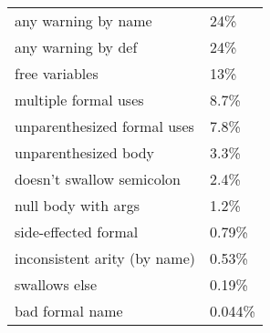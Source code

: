 \begin{tabular}{|l|l|} \hline
any warning by name & 24\% \\ 
any warning by def & 24\% \\ 
free variables & 13\% \\ 
multiple formal uses & 8.7\% \\ 
unparenthesized formal uses & 7.8\% \\ 
unparenthesized body & 3.3\% \\ 
doesn't swallow semicolon & 2.4\% \\ 
null body with args & 1.2\% \\ 
side-effected formal & 0.79\% \\ 
inconsistent arity (by name) & 0.53\% \\ 
swallows else & 0.19\% \\
bad formal name & 0.044\% \\ 
\hline
\end{tabular}

